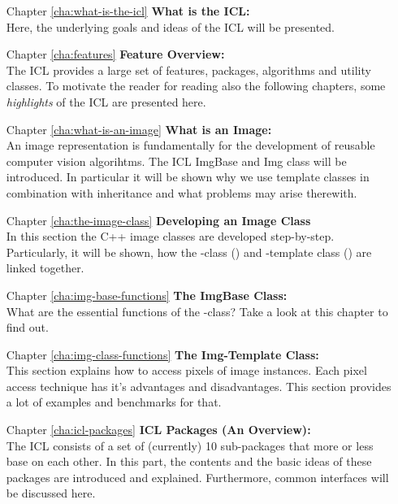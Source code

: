 \begin{itemize}
\item [Chapter \ref{cha:what-is-the-icl}] \textbf{What is the ICL:}\\ Here, the underlying goals and ideas of the ICL will be presented.
\item [Chapter \ref{cha:features}] \textbf{Feature Overview:}\\ The ICL provides a large set of features, packages, algorithms and utility classes. To motivate the reader for reading also the following chapters, some \emph{highlights} of the ICL are presented here.
\item [Chapter \ref{cha:what-is-an-image}] \textbf{What is an Image:}\\ An image representation is fundamentally for the development of reusable computer vision algorihtms. The ICL ImgBase  and Img  class will be introduced. In particular it will be shown why we use template classes in combination with inheritance and what problems may arise therewith. 
\item [Chapter \ref{cha:the-image-class}]\textbf{Developing an Image Class}\\
In this section the C++ image classes are developed step-by-step. Particularly, it will be shown, how the -class () and -template class () are linked together. 
\item [Chapter \ref{cha:img-base-functions}]\textbf{The ImgBase Class:}\\
What are the essential functions of the -class? Take a look at this chapter to find out.
\item [Chapter \ref{cha:img-class-functions}]\textbf{The Img-Template Class:}\\
This section explains how to access pixels of image instances. Each pixel access technique has it's advantages and disadvantages. This section provides a lot of examples and benchmarks for that.
\item [Chapter \ref{cha:icl-packages}]\textbf{ICL Packages (An Overview):}\\ The ICL consists of a set of (currently) 10 sub-packages that more or less base on each other. In this part, the contents and the basic ideas of these packages are introduced and explained. Furthermore, common interfaces will be discussed here.

\end{itemize}

